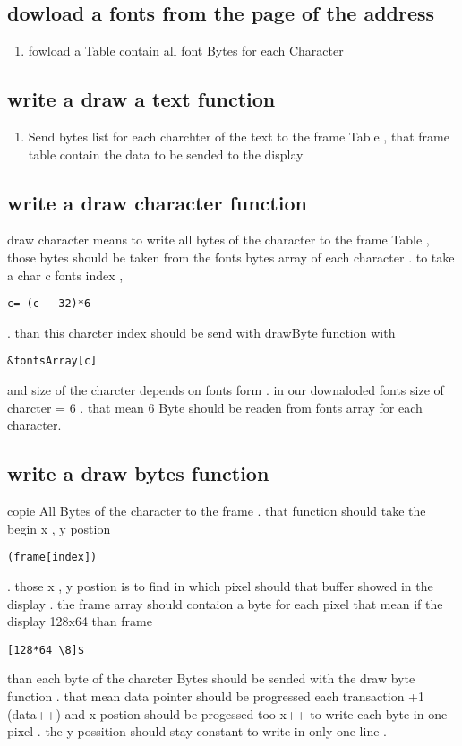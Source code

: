 \documentclass[11pt]{article}
\begin{document}
\vspace{4cm}
\subsection{dowload a fonts from the page of the address}
\begin{enumerate}
\item fowload a Table contain all font Bytes for each Character
\end{enumerate}

\vspace{4cm}
\subsection{write a draw a text function}
\begin{enumerate}
\item Send  bytes list for each charchter of the text to the frame Table , that frame table contain the data to be sended to the display 
\end{enumerate}
\subsection{write a draw character function}

draw character means to write all bytes of the character to the frame Table , those bytes should be taken from the fonts bytes array of each character  . to take a char c  fonts index ,
 \begin{lstlisting}
c= (c - 32)*6
\end{lstlisting} 
 . than this charcter index should be send with drawByte function with \begin{lstlisting}
&fontsArray[c]
\end{lstlisting}
 and size of the charcter depends on fonts form . in our downaloded fonts size of charcter = 6 . that mean 6 Byte should be readen from fonts array for each character. 
\subsection{write a draw bytes function}
copie All Bytes of the character to the frame . that function should take the begin x , y postion \begin{lstlisting}
(frame[index])
\end{lstlisting} 
. those x , y postion is to find in which pixel should that buffer showed in the display . the frame array should contaion a byte for each pixel that mean if the display 128x64 than frame
 \begin{lstlisting}
[128*64 \8]$
\end{lstlisting}
than each byte of the charcter Bytes should be sended with the draw byte function . that mean  data pointer should be progressed each transaction +1 (data++) and x postion should be progessed too x++ to write each byte in one pixel . the y possition should stay constant to write in only one line . 
\end{document}

